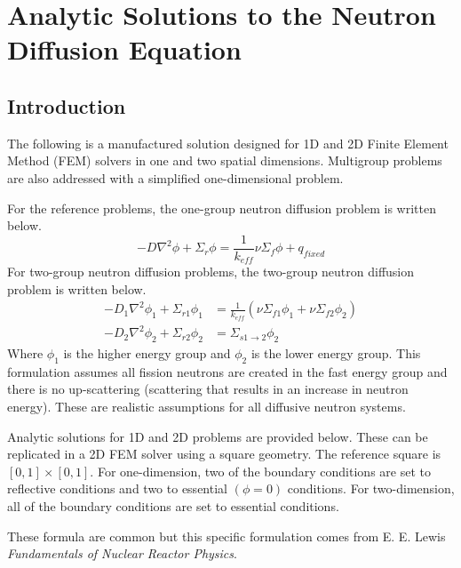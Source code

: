 \chapter{Analytic Solutions to the Neutron Diffusion Equation}

\section{Introduction}
  The following is a manufactured solution designed for 1D and 2D Finite Element 
  Method (FEM) solvers in one and two spatial dimensions. Multigroup 
  problems are also addressed with a simplified one-dimensional problem.
  
  For the reference problems, the one-group neutron diffusion problem is written
  below.
  \begin{equation} \label{eq:onegroup}
    -D \nabla^2 \phi + \Sigma_r \phi =  \frac{1}{k_{eff}} \nu \Sigma_f \phi + 
      q_{fixed}
  \end{equation}
  For two-group neutron diffusion problems, the two-group neutron diffusion 
  problem is written below.
  \begin{align} 
    -D_1 \nabla^2 \phi_1 + \Sigma_{r1} \phi_1 &= \frac{1}{k_{eff}} \left(
      \nu \Sigma_{f1} \phi_1 + \nu \Sigma_{f2} \phi_2 \right) \\
    -D_2 \nabla^2 \phi_2 + \Sigma_{r2} \phi_2 &= 
      \Sigma_{s 1 \rightarrow 2} \phi_2
  \end{align}
  Where $\phi_1$ is the higher energy group and $\phi_2$ is the lower energy 
  group. This formulation assumes all fission neutrons are created in the fast 
  energy group and there is no up-scattering (scattering that results in an 
  increase in neutron energy). These are realistic assumptions for all diffusive
  neutron systems.

  Analytic solutions for 1D and 2D problems are provided below. These can be 
  replicated in a 2D FEM solver using a square geometry. The reference square is 
  $[0,1]\times[0,1]$. For one-dimension, two of the boundary conditions are set
  to reflective conditions and two to essential $(\phi = 0)$ conditions. For 
  two-dimension, all of the boundary conditions are set to essential conditions.
  
  These formula are common but this specific formulation comes from E. E. Lewis
  \textit{Fundamentals of Nuclear Reactor Physics}.

